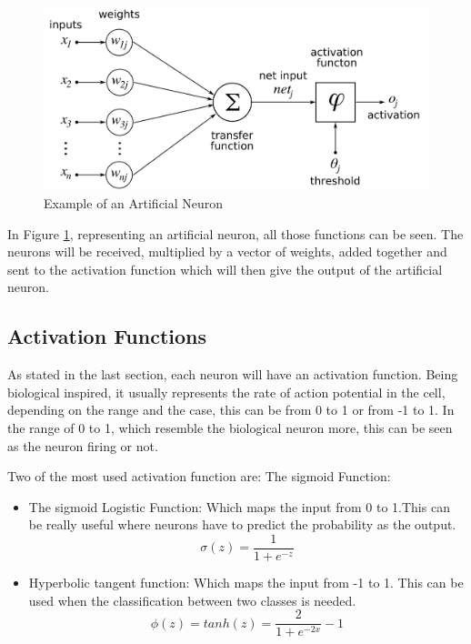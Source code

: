 \begin{figure}[htp]
	\centering
	\includegraphics[width=1\textwidth]{Illustrations/artificialneuron.png}
	\caption{Example of an Artificial Neuron}
	\label{fig:ArtificialNeuron}
\end{figure}
\newpage
In Figure \ref{fig:ArtificialNeuron}, representing an artificial neuron, all those functions can be seen. The neurons will be received, multiplied by a vector of weights, added together and sent to the activation function which will then give the output of the artificial neuron.

\subsection{Activation Functions}

As stated in the last section, each neuron will have an activation function. Being biological inspired, it usually represents the rate of action potential in the cell, depending on the range and the case, this can be from 0 to 1 or from -1 to 1. In the range of 0 to 1, which resemble the biological neuron more, this can be seen as the neuron firing or not.

Two of the most used activation function are:
The sigmoid Function:

\begin{itemize}
\item The sigmoid Logistic Function: Which maps the input from 0 to 1.This can be really useful where neurons have to predict the probability as the output.
\begin{equation}
 \sigma(z) = \frac{1}{1+e^{-z}}
\end{equation}

\item Hyperbolic tangent function: Which maps the input from -1 to 1. This can be used when the classification between two classes is needed.
\begin{equation}
 \phi(z) = tanh(z)= \frac{2}{1+e^{-2x}}-1
\end{equation}

\end{itemize}

